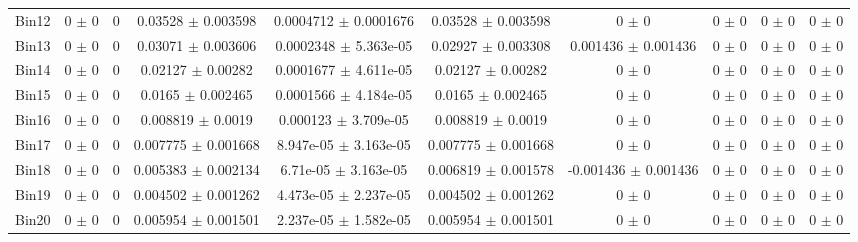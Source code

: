 \begin{tabular}{@{\extracolsep{4pt}}lccccccccc@{}}
     Bin12 & 0 $\pm$ 0 & 0 & 0.03528 $\pm$ 0.003598 & 0.0004712 $\pm$ 0.0001676 & 0.03528 $\pm$ 0.003598 & 0 $\pm$ 0 & 0 $\pm$ 0 & 0 $\pm$ 0 & 0 $\pm$ 0 \\ 
     Bin13 & 0 $\pm$ 0 & 0 & 0.03071 $\pm$ 0.003606 & 0.0002348 $\pm$ 5.363e-05 & 0.02927 $\pm$ 0.003308 & 0.001436 $\pm$ 0.001436 & 0 $\pm$ 0 & 0 $\pm$ 0 & 0 $\pm$ 0 \\ 
     Bin14 & 0 $\pm$ 0 & 0 & 0.02127 $\pm$ 0.00282 & 0.0001677 $\pm$ 4.611e-05 & 0.02127 $\pm$ 0.00282 & 0 $\pm$ 0 & 0 $\pm$ 0 & 0 $\pm$ 0 & 0 $\pm$ 0 \\ 
     Bin15 & 0 $\pm$ 0 & 0 & 0.0165 $\pm$ 0.002465 & 0.0001566 $\pm$ 4.184e-05 & 0.0165 $\pm$ 0.002465 & 0 $\pm$ 0 & 0 $\pm$ 0 & 0 $\pm$ 0 & 0 $\pm$ 0 \\ 
     Bin16 & 0 $\pm$ 0 & 0 & 0.008819 $\pm$ 0.0019 & 0.000123 $\pm$ 3.709e-05 & 0.008819 $\pm$ 0.0019 & 0 $\pm$ 0 & 0 $\pm$ 0 & 0 $\pm$ 0 & 0 $\pm$ 0 \\ 
     Bin17 & 0 $\pm$ 0 & 0 & 0.007775 $\pm$ 0.001668 & 8.947e-05 $\pm$ 3.163e-05 & 0.007775 $\pm$ 0.001668 & 0 $\pm$ 0 & 0 $\pm$ 0 & 0 $\pm$ 0 & 0 $\pm$ 0 \\ 
     Bin18 & 0 $\pm$ 0 & 0 & 0.005383 $\pm$ 0.002134 & 6.71e-05 $\pm$ 3.163e-05 & 0.006819 $\pm$ 0.001578 & -0.001436 $\pm$ 0.001436 & 0 $\pm$ 0 & 0 $\pm$ 0 & 0 $\pm$ 0 \\ 
     Bin19 & 0 $\pm$ 0 & 0 & 0.004502 $\pm$ 0.001262 & 4.473e-05 $\pm$ 2.237e-05 & 0.004502 $\pm$ 0.001262 & 0 $\pm$ 0 & 0 $\pm$ 0 & 0 $\pm$ 0 & 0 $\pm$ 0 \\ 
     Bin20 & 0 $\pm$ 0 & 0 & 0.005954 $\pm$ 0.001501 & 2.237e-05 $\pm$ 1.582e-05 & 0.005954 $\pm$ 0.001501 & 0 $\pm$ 0 & 0 $\pm$ 0 & 0 $\pm$ 0 & 0 $\pm$ 0 \\ 
\hline\hline
  \end{tabular}
